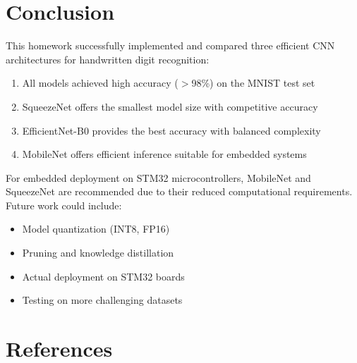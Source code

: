 \documentclass[12pt,a4paper]{article}
\begin{document}
\section{Conclusion}

This homework successfully implemented and compared three efficient CNN architectures for handwritten digit recognition:

\begin{enumerate}
    \item All models achieved high accuracy ($>$98\%) on the MNIST test set
    \item SqueezeNet offers the smallest model size with competitive accuracy
    \item EfficientNet-B0 provides the best accuracy with balanced complexity
    \item MobileNet offers efficient inference suitable for embedded systems
\end{enumerate}

For embedded deployment on STM32 microcontrollers, MobileNet and SqueezeNet are recommended due to their reduced computational requirements. Future work could include:
\begin{itemize}
    \item Model quantization (INT8, FP16)
    \item Pruning and knowledge distillation
    \item Actual deployment on STM32 boards
    \item Testing on more challenging datasets
\end{itemize}

\section*{References}
\end{document}
